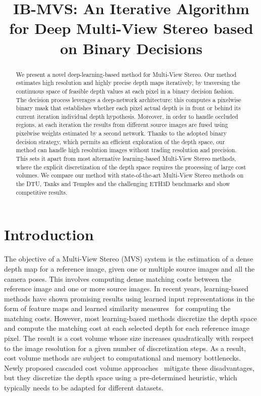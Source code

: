 \documentclass{bmvc2k}
\title{IB-MVS: An Iterative Algorithm for Deep Multi-View Stereo based on Binary Decisions}
\begin{document}
 

\maketitle

\begin{abstract}
We present a novel deep-learning-based method for Multi-View Stereo. Our method estimates high resolution and highly precise depth maps iteratively, by traversing the continuous space of feasible depth values at each pixel in a binary decision fashion. The decision process leverages a deep-network architecture: this computes a pixelwise binary mask that establishes whether each pixel actual depth is in front or behind its current iteration individual depth hypothesis. Moreover, in order to handle occluded regions, at each iteration the results from different source images are fused using pixelwise weights estimated by a second network. Thanks to the adopted binary decision strategy, which permits an efficient exploration of the depth space, our method can handle high resolution images without trading resolution and precision. This sets it apart from most alternative learning-based Multi-View Stereo methods, where the explicit discretization of the depth space requires the processing of large cost volumes. We compare our method with state-of-the-art Multi-View Stereo methods on the DTU, Tanks and Temples and the challenging ETH3D benchmarks and show competitive results.
\end{abstract}

\section{Introduction}

The objective of a Multi-View Stereo (MVS) system is the estimation of a dense depth map for a reference image, given one or multiple source images and all the camera poses.
This involves computing dense matching costs between the reference image and one or more source images.
In recent years, learning-based methods have shown promising results using learned input representations in the form of feature maps and learned similarity measures~\cite{mvsnet, casmvs,rmvsnet} for computing the matching costs.
However, most learning-based methods discretize the depth space and compute the matching cost at each selected depth for each reference image pixel.
The result is a cost volume whose size increases quadratically with respect to the image resolution for a given number of discretization steps.
As a result, cost volume methods are subject to computational and memory bottlenecks.
Newly proposed cascaded cost volume approaches~\cite{casmvs} mitigate these disadvantages, but they discretize the depth space using a pre-determined heuristic, which typically needs to be adapted for different datasets.
\end{document}
